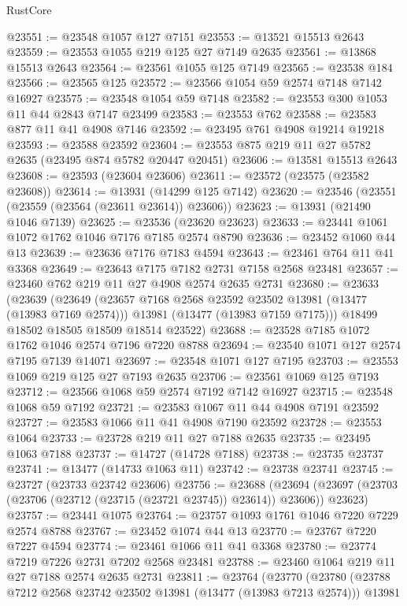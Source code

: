 \begin{lexlean}{RustCore}
\begin{coremodule}
@23551 := @23548 @1057 @127 @7151
@23553 := @13521 @15513 @2643
@23559 := @23553 @1055 @219 @125 @27 @7149 @2635
@23561 := @13868 @15513 @2643
@23564 := @23561 @1055 @125 @7149
@23565 := @23538 @184
@23566 := @23565 @125
@23572 := @23566 @1054 @59 @2574 @7148 @7142 @16927
@23575 := @23548 @1054 @59 @7148
@23582 := @23553 @300 @1053 @11 @44 @2843 @7147 @23499
@23583 := @23553 @762
@23588 := @23583 @877 @11 @41 @4908 @7146
@23592 := @23495 @761 @4908 @19214 @19218
@23593 := @23588 @23592
@23604 := @23553 @875 @219 @11 @27 @5782 @2635 (@23495 @874 @5782 @20447 @20451)
@23606 := @13581 @15513 @2643
@23608 := @23593 (@23604 @23606)
@23611 := @23572 (@23575 (@23582 @23608))
@23614 := @13931 (@14299 @125 @7142)
@23620 := @23546 (@23551 (@23559 (@23564 (@23611 @23614)) @23606))
@23623 := @13931 (@21490 @1046 @7139)
@23625 := @23536 (@23620 @23623)
@23633 := @23441 @1061 @1072 @1762 @1046 @7176 @7185 @2574 @8790
@23636 := @23452 @1060 @44 @13
@23639 := @23636 @7176 @7183 @4594
@23643 := @23461 @764 @11 @41 @3368
@23649 := @23643 @7175 @7182 @2731 @7158 @2568 @23481
@23657 := @23460 @762 @219 @11 @27 @4908 @2574 @2635 @2731
@23680 := @23633
    (@23639
      (@23649
        (@23657 @7168 @2568 @23592 @23502 @13981 (@13477 (@13983 @7169 @2574)))
        @13981
        (@13477 (@13983 @7159 @7175)))
      @18499
      @18502
      @18505
      @18509
      @18514
      @23522)
@23688 := @23528 @7185 @1072 @1762 @1046 @2574 @7196 @7220 @8788
@23694 := @23540 @1071 @127 @2574 @7195 @7139 @14071
@23697 := @23548 @1071 @127 @7195
@23703 := @23553 @1069 @219 @125 @27 @7193 @2635
@23706 := @23561 @1069 @125 @7193
@23712 := @23566 @1068 @59 @2574 @7192 @7142 @16927
@23715 := @23548 @1068 @59 @7192
@23721 := @23583 @1067 @11 @44 @4908 @7191 @23592
@23727 := @23583 @1066 @11 @41 @4908 @7190 @23592
@23728 := @23553 @1064
@23733 := @23728 @219 @11 @27 @7188 @2635
@23735 := @23495 @1063 @7188
@23737 := @14727 (@14728 @7188)
@23738 := @23735 @23737
@23741 := @13477 (@14733 @1063 @11)
@23742 := @23738 @23741
@23745 := @23727 (@23733 @23742 @23606)
@23756 := @23688
    (@23694 (@23697 (@23703 (@23706 (@23712 (@23715 (@23721 @23745)) @23614)) @23606)) @23623)
@23757 := @23441 @1075
@23764 := @23757 @1093 @1761 @1046 @7220 @7229 @2574 @8788
@23767 := @23452 @1074 @44 @13
@23770 := @23767 @7220 @7227 @4594
@23774 := @23461 @1066 @11 @41 @3368
@23780 := @23774 @7219 @7226 @2731 @7202 @2568 @23481
@23788 := @23460 @1064 @219 @11 @27 @7188 @2574 @2635 @2731
@23811 := @23764
    (@23770
      (@23780
        (@23788 @7212 @2568 @23742 @23502 @13981 (@13477 (@13983 @7213 @2574)))
        @13981

\end{coremodule}
\end{lexlean}
